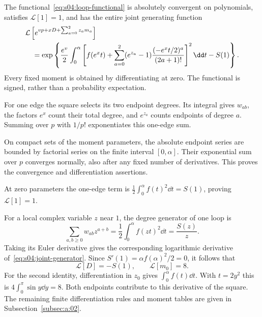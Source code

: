 \begin{lmm}\label{lmm:s04:loop-moments}
The functional~\eqref{eq:s04:loop-functional} is absolutely convergent
on polynomials, satisfies $\mathcal L[1]=1$, and has the entire
joint generating function
\begin{align}
 &\mathcal L\left[e^{vp+xD+\sum_{a=0}^2z_a m_a}\right]\notag\\
 &\quad=\exp\left\{\frac{e^v}{2}\int_0^\alpha
 \left[f(e^x t)+\sum_{a=0}^2(e^{z_a}-1)
               \frac{(-e^x t/2)^a}{(2a+1)!}\right]^2\dd t-S(1)\right\}.
 \label{eq:s04:joint-generator}
\end{align}
Every fixed moment is obtained by differentiating at zero. The
functional is signed, rather than a probability expectation.
\end{lmm}
\begin{prf}
For one edge the square selects its two endpoint degrees. Its
integral gives $w_{ab}$, the factors $e^x$ count their total degree,
and $e^{z_a}$ counts endpoints of degree $a$. Summing over $p$ with
$1/p!$ exponentiates this one-edge sum.

On compact sets of the moment parameters, the absolute endpoint
series are bounded by factorial series on the finite interval
$[0,\alpha]$. Their exponential sum over $p$ converges normally,
also after any fixed number of derivatives. This proves the
convergence and differentiation assertions.

At zero parameters the
one-edge term is $\tfrac12\int_0^\alpha f(t)^2\dd t=S(1)$, proving
$\mathcal L[1]=1$.
\end{prf}

\begin{exm}
For a local complex variable $z$ near $1$, the degree generator of
one loop is
\[
 \sum_{a,b\geq0}w_{ab}z^{a+b}
 =\frac12\int_0^\alpha f(zt)^2\dd t=\frac{S(z)}z.
\]
Taking its Euler derivative gives the corresponding logarithmic
derivative of~\eqref{eq:s04:joint-generator}. Since
$S'(1)=\alpha f(\alpha)^2/2=0$, it follows that
\begin{equation}\label{eq:s04:representative-moments}
 \mathcal L[D]=-S(1),\qquad \mathcal L[m_0]=8.
\end{equation}
For the second identity, differentiation in $z_0$ gives
$\int_0^\alpha f(t)\dd t$. With $t=2y^2$ this is
$4\int_0^\pi\sin y\dd y=8$. Both endpoints contribute to this
derivative of the square. The remaining finite differentiation rules
and moment tables are given in Subsection~\ref{subsec:a:02}.
\end{exm}
